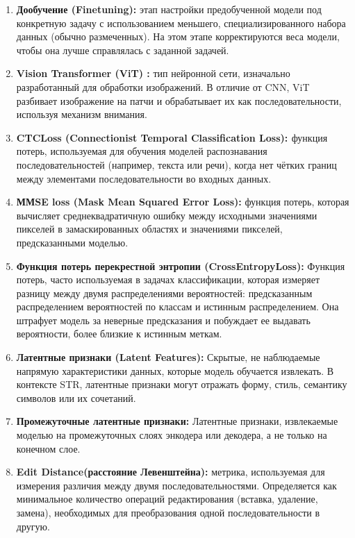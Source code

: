 \begin{enumerate}
    \item  \textbf{Дообучение (Finetuning):}  этап  настройки  предобученной  модели  под  конкретную задачу с использованием  меньшего, специализированного набора данных (обычно размеченных). На этом этапе  корректируются  веса модели,  чтобы  она  лучше  справлялась  с  заданной  задачей. 

    \item  \textbf{ Vision Transformer (ViT) \cite{dosovitskiy2020image}:} тип  нейронной  сети,  изначально  разработанный  для  обработки  изображений.  В  отличие  от  CNN, ViT  разбивает  изображение  на  патчи  и  обрабатывает  их  как  последовательности, используя  механизм  внимания.  

    \item  \textbf{ CTCLoss (Connectionist Temporal Classification Loss): \cite{graves2006connectionist}} функция  потерь,  используемая  для  обучения  моделей  распознавания  последовательностей  (например,  текста  или  речи),  когда  нет  чётких  границ  между  элементами  последовательности  во  входных  данных. 

    \item  \textbf{ ММSE loss (Mask Mean Squared Error Loss):} функция потерь, которая вычисляет среднеквадратичную ошибку  между исходными значениями пикселей в замаскированных областях и значениями пикселей, предсказанными моделью.

    \item \textbf{Функция потерь перекрестной энтропии (CrossEntropyLoss):} Функция потерь, часто используемая в задачах классификации, которая измеряет разницу между двумя распределениями вероятностей: предсказанным распределением вероятностей по классам и истинным распределением. Она штрафует модель за неверные предсказания и побуждает ее выдавать вероятности, более близкие к истинным меткам.

    \item  \textbf{Латентные признаки (Latent Features):} Скрытые, не наблюдаемые напрямую характеристики данных, которые модель обучается извлекать.  В контексте STR,  латентные  признаки могут  отражать форму,  стиль,  семантику  символов или их сочетаний. 

    \item  \textbf{Промежуточные латентные признаки:} Латентные признаки,  извлекаемые  моделью на промежуточных слоях энкодера или декодера, а не только на конечном слое.   

    \item  \textbf{Edit Distance(расстояние Левенштейна):}  метрика, используемая для измерения  различия между двумя последовательностями.  Определяется как минимальное количество операций редактирования (вставка, удаление, замена),  необходимых для преобразования одной последовательности в другую.


\end{enumerate}
